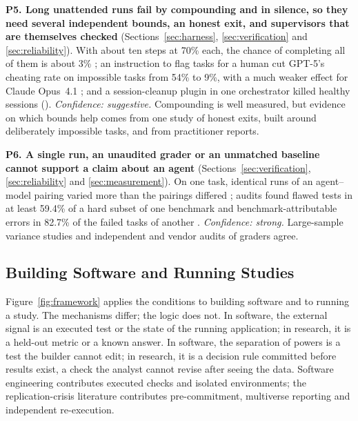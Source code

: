 \textbf{P5. Long unattended runs fail by compounding and in silence, so they need several independent bounds, an honest exit, and supervisors that are themselves checked} (Sections~\ref{sec:harness}, \ref{sec:verification} and \ref{sec:reliability}). With about ten steps at 70\% each, the chance of completing all of them is about 3\% \citep{S19}; an instruction to flag tasks for a human cut GPT-5's cheating rate on impossible tasks from 54\% to 9\%, with a much weaker effect for Claude Opus~4.1 \citep{V3}; and a session-cleanup plugin in one orchestrator killed healthy sessions (). \emph{Confidence: suggestive.} Compounding is well measured, but evidence on which bounds help comes from one study of honest exits, built around deliberately impossible tasks, and from practitioner reports.

\textbf{P6. A single run, an unaudited grader or an unmatched baseline cannot support a claim about an agent} (Sections~\ref{sec:verification}, \ref{sec:reliability} and \ref{sec:measurement}). On one task, identical runs of an agent--model pairing varied more than the pairings differed \citep{F24}; audits found flawed tests in at least 59.4\% of a hard subset of one benchmark \citep{C15} and benchmark-attributable errors in 82.7\% of the failed tasks of another \citep{D13}. \emph{Confidence: strong.} Large-sample variance studies and independent and vendor audits of graders agree.

\subsection{Building Software and Running Studies}

Figure~\ref{fig:framework} applies the conditions to building software and to running a study. The mechanisms differ; the logic does not. In software, the external signal is an executed test or the state of the running application; in research, it is a held-out metric or a known answer. In software, the separation of powers is a test the builder cannot edit; in research, it is a decision rule committed before results exist, a check the analyst cannot revise after seeing the data. Software engineering contributes executed checks and isolated environments; the replication-crisis literature contributes pre-commitment, multiverse reporting and independent re-execution.

